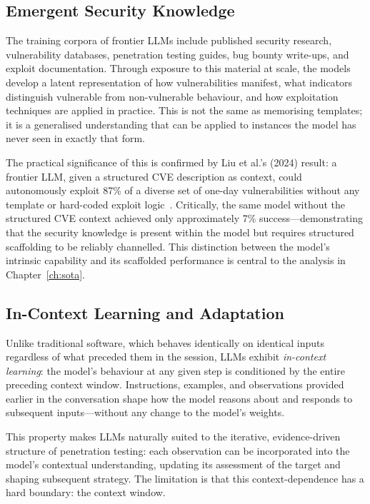\documentclass[12pt,a4paper,oneside,openany]{book}
\newcommand{\term}[1]{\textit{#1}}
\begin{document}
\subsection{Emergent Security Knowledge}

The training corpora of frontier LLMs include published security research, vulnerability databases, penetration testing guides, bug bounty write-ups, and exploit documentation. Through exposure to this material at scale, the models develop a latent representation of how vulnerabilities manifest, what indicators distinguish vulnerable from non-vulnerable behaviour, and how exploitation techniques are applied in practice. This is not the same as memorising templates; it is a generalised understanding that can be applied to instances the model has never seen in exactly that form.

The practical significance of this is confirmed by Liu et al.'s (2024) result: a frontier LLM, given a structured CVE description as context, could autonomously exploit 87\% of a diverse set of one-day vulnerabilities without any template or hard-coded exploit logic~\citep{liu2024gpts}. Critically, the same model without the structured CVE context achieved only approximately 7\% success---demonstrating that the security knowledge is present within the model but requires structured scaffolding to be reliably channelled. This distinction between the model's intrinsic capability and its scaffolded performance is central to the analysis in Chapter~\ref{ch:sota}.

\subsection{In-Context Learning and Adaptation}

Unlike traditional software, which behaves identically on identical inputs regardless of what preceded them in the session, LLMs exhibit \term{in-context learning}: the model's behaviour at any given step is conditioned by the entire preceding context window. Instructions, examples, and observations provided earlier in the conversation shape how the model reasons about and responds to subsequent inputs---without any change to the model's weights.

This property makes LLMs naturally suited to the iterative, evidence-driven structure of penetration testing: each observation can be incorporated into the model's contextual understanding, updating its assessment of the target and shaping subsequent strategy. The limitation is that this context-dependence has a hard boundary: the context window.
\end{document}
